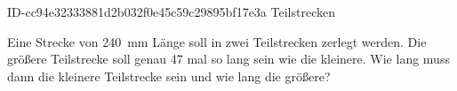 \begin{exercise}
      {ID-cc94e32333881d2b032f0e45c59c29895bf17e3a}
      {Teilstrecken}
  \ifproblem\problem\par
    Eine Strecke von \SI{240}{\milli\metre} Länge soll in zwei Teilstrecken zerlegt werden.
    Die größere Teilstrecke soll genau 47 mal so lang sein wie die kleinere.
    Wie lang muss dann die kleinere Teilstrecke sein und wie lang die größere?
  \fi
\end{exercise}

